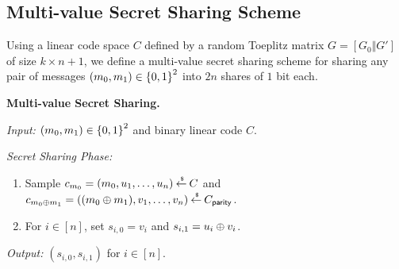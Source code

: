 \subsection{Multi-value Secret Sharing Scheme}
Using a linear code space $C$ defined by a random Toeplitz matrix $G = [G_0\Vert G']$ of size $k \times n+1$, we define a multi-value secret sharing scheme for sharing any pair of messages $(m_0,m_1) \in {\{0,1\}}^2$ into $2n$ shares of $1$ bit each.

\begin{boxedalgo}
	\textbf{Multi-value Secret Sharing.}
	
	\textit{Input:} $(m_0,m_1) \in {\{0,1\}}^2$ and binary linear code $C$.
	
	\textit{Secret Sharing Phase:}
	\begin{enumerate}
		\item Sample $c_{m_0} = (m_0,u_1,\dotsc,u_n) \mathbin{\stackrel{\mbox{\,\tiny \$}}{\gets}} C$ and $c_{m_0\oplus m_1} = ((m_0\oplus m_1), v_1,\dotsc, v_n) \mathbin{\stackrel{\mbox{\,\tiny \$}}{\gets}} C_{\mathsf{parity}}$.
		\item For $i \in [n]$, set $s_{i,0} = v_i$ and $s_{i,1} = u_i \oplus v_i$.
	\end{enumerate}
	
	\textit{Output:} $(s_{i,0}, s_{i,1})$ for $i \in [n]$.
\end{boxedalgo}

